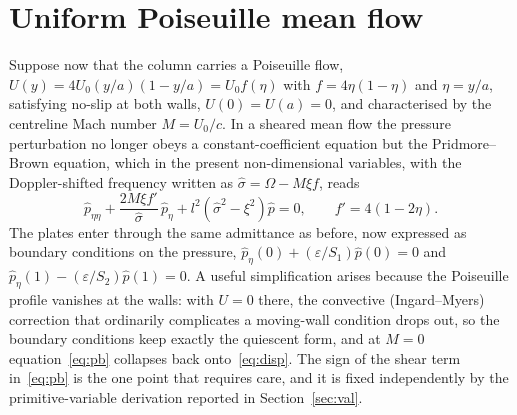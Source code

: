 \documentclass[11pt]{article}
\newcommand{\Om}{\Omega}
\newcommand{\eps}{\varepsilon}
\begin{document}
\section{Uniform Poiseuille mean flow}
Suppose now that the column carries a Poiseuille flow, $U(y)=4U_0(y/a)(1-y/a)=U_0f(\eta)$ with
$f=4\eta(1-\eta)$ and $\eta=y/a$, satisfying no-slip at both walls, $U(0)=U(a)=0$, and characterised by
the centreline Mach number $M=U_0/c$. In a sheared mean flow the pressure perturbation no longer obeys
a constant-coefficient equation but the Pridmore--Brown equation, which in the present non-dimensional
variables, with the Doppler-shifted frequency written as $\hat\sigma=\Om-M\xi f$, reads
\begin{equation}
\hat p_{\eta\eta}+\frac{2M\xi f'}{\hat\sigma}\,\hat p_\eta+l^2(\hat\sigma^2-\xi^2)\hat p=0,
\qquad f'=4(1-2\eta).
\label{eq:pb}
\end{equation}
The plates enter through the same admittance as before, now expressed as boundary conditions on the
pressure, $\hat p_\eta(0)+(\eps/S_1)\hat p(0)=0$ and $\hat p_\eta(1)-(\eps/S_2)\hat p(1)=0$. A useful
simplification arises because the Poiseuille profile vanishes at the walls: with $U=0$ there, the
convective (Ingard--Myers) correction that ordinarily complicates a moving-wall condition drops out, so
the boundary conditions keep exactly the quiescent form, and at $M=0$ equation~\eqref{eq:pb} collapses
back onto~\eqref{eq:disp}. The sign of the shear term in~\eqref{eq:pb} is the one point that requires
care, and it is fixed independently by the primitive-variable derivation reported in
Section~\ref{sec:val}.
\end{document}
